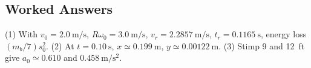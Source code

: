 \subsection{Worked Answers}\label{sec:putting_worked_answers}

(1) With $v_0=2.0\ \mathrm{m/s}$, $R\omega_0=3.0\ \mathrm{m/s}$, $v_r=2.2857\ \mathrm{m/s}$, $t_r=0.1165\ \mathrm s$, energy loss $(m_b/7)s_0^2$. (2) At $t=0.10\ \mathrm s$, $x\simeq0.199\ \mathrm m$, $y\simeq0.00122\ \mathrm m$. (3) Stimp 9 and 12~ft give $a_0\simeq0.610$ and $0.458\ \mathrm{m/s^2}$.
